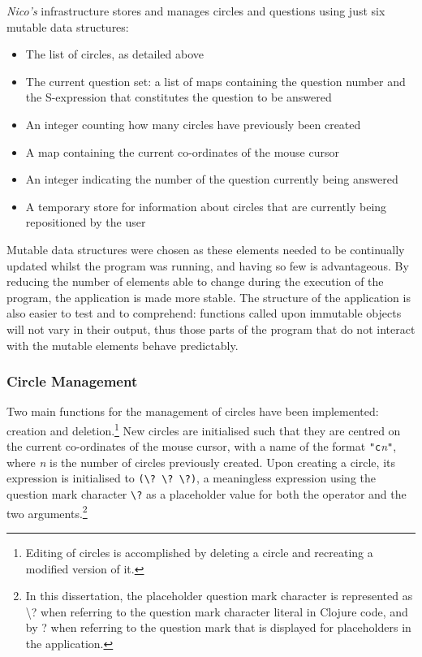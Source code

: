 \documentclass[12pt,twoside,notitlepage,xetex]{report}
\begin{document}
\emph{Nico's} infrastructure stores and manages circles and questions using just six mutable data structures:
\begin{itemize}
\item The list of circles, as detailed above
\item The current question set: a list of maps containing the question number and the S-expression that constitutes the question to be answered
\item An integer counting how many circles have previously been created
\item A map containing the current co-ordinates of the mouse cursor
\item An integer indicating the number of the question currently being answered
\item A temporary store for information about circles that are currently being repositioned by the user
\end{itemize}

Mutable data structures were chosen as these elements needed to be continually updated whilst the program was running, and having so few is advantageous.  By reducing the number of elements able to change during the execution of the program, the application is made more stable.  The structure of the application is also easier to test and to comprehend: functions called upon immutable objects will not vary in their output, thus those parts of the program that do not interact with the mutable elements behave predictably.

%
\subsubsection{Circle Management}

Two main functions for the management of circles have been implemented: creation and deletion.\footnote{Editing of circles is accomplished by deleting a circle and recreating a modified version of it.}  New circles are initialised such that they are centred on the current co-ordinates of the mouse cursor, with a name of the format \verb¬"c¬\emph{n}\verb¬"¬, where \emph{n} is the number of circles previously created.  Upon creating a circle, its expression is initialised to \verb¬(\? \? \?)¬, a meaningless expression using the question mark character \verb¬\?¬ as a placeholder value for both the operator and the two arguments.\footnote{In this dissertation, the placeholder question mark character is represented as {\ttfamily \textbackslash?} when referring to the question mark character literal in Clojure code, and by {\sfapp ?} when referring to the question mark that is displayed for placeholders in the application.}
\end{document}
